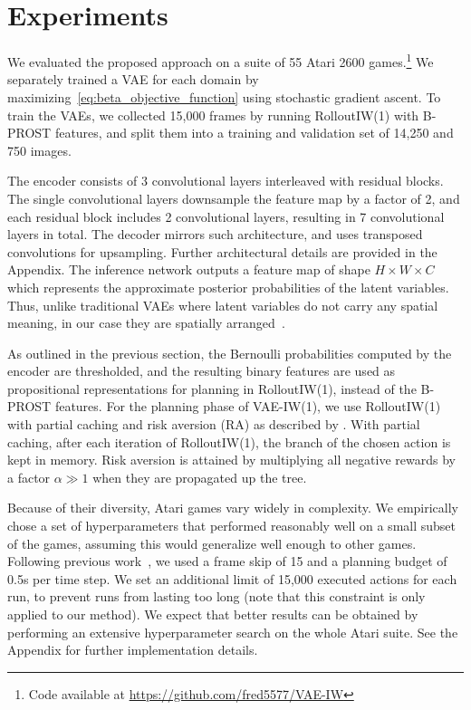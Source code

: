 \section{Experiments}

We evaluated the proposed approach on a suite of 55 Atari 2600 games.\footnote{
Code available at \url{https://github.com/fred5577/VAE-IW}}
%
We separately trained a VAE for each domain by maximizing~\cref{eq:beta_objective_function} using stochastic gradient ascent.
%
To train the VAEs, we collected 15,000 frames by running RolloutIW(1) with B-PROST features, and split them into a training and validation set of 14,250 and 750 images.

The encoder consists of 3 convolutional layers interleaved with residual blocks. The single convolutional layers downsample the feature map by a factor of 2, and each residual block includes 2 convolutional layers, resulting in 7 convolutional layers in total. The decoder mirrors such architecture, and uses transposed convolutions for upsampling. Further architectural details are provided in the Appendix.
The inference network outputs a feature map of shape $H \times W \times C$ which represents the approximate posterior probabilities of the latent variables. Thus, unlike traditional VAEs where latent variables do not carry any spatial meaning, in our case they are spatially arranged~\cite{vahdat2020nvae}.

As outlined in the previous section, the Bernoulli probabilities computed by the encoder are thresholded, and the resulting binary features are used as propositional representations for planning in RolloutIW(1), instead of the B-PROST features.
For the planning phase of VAE-IW(1), we use RolloutIW(1) with partial caching and risk aversion (RA) as described by \citet{rolloutiw-orginal}. With partial caching, after each iteration of RolloutIW(1), the branch of the chosen action is kept in memory. Risk aversion is attained by multiplying all negative rewards by a factor $\alpha \gg 1$ when they are propagated up the tree.

Because of their diversity, Atari games vary widely in complexity.
We empirically chose a set of hyperparameters that performed reasonably well on a small subset of the games, assuming this would generalize well enough to other games.
Following previous work~\cite{iworginal,rolloutiw-orginal}, we used a frame skip of 15 and a planning budget of 0.5s per time step.
We set an additional limit of 15,000 executed actions for each run, to prevent runs from lasting too long (note that this constraint is only applied to our method).
We expect that better results can be obtained by performing an extensive hyperparameter search on the whole Atari suite.
See the Appendix for further implementation details.


